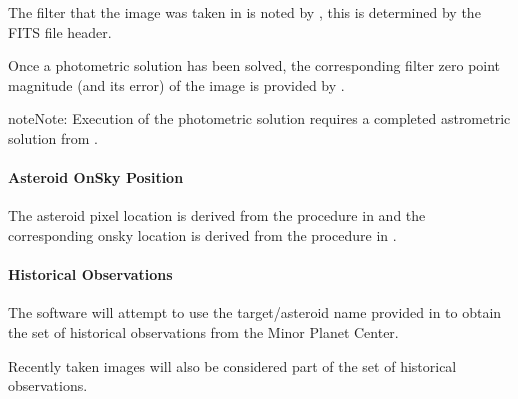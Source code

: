 \documentclass[letterpaper,11pt,english]{sphinxmanual}
\begin{document}
\sphinxAtStartPar
The filter that the image was taken in is noted by , this is
determined by the FITS file header.

\sphinxAtStartPar
Once a photometric solution has been solved, the corresponding filter zero
point magnitude (and its error) of the image is provided by
.

\begin{sphinxadmonition}{note}{Note:}
\sphinxAtStartPar
Execution of the photometric solution requires a completed astrometric
solution from
{\hyperref[\detokenize{user/manual_mode:user-manual-mode-procedure-find-asteroid-location-compute-astrometric-solution}]{}}.
\end{sphinxadmonition}


\paragraph{Asteroid On\sphinxhyphen{}Sky Position}
\label{\detokenize{user/manual_mode:asteroid-on-sky-position}}\label{\detokenize{user/manual_mode:user-manual-mode-procedure-asteroid-on-sky-position}}
\sphinxAtStartPar
The asteroid pixel location is derived from the procedure in
{\hyperref[\detokenize{user/manual_mode:user-manual-mode-procedure-find-asteroid-location-target-selector-gui}]{}}
and the corresponding on\sphinxhyphen{}sky location is derived from the procedure in
{\hyperref[\detokenize{user/manual_mode:user-manual-mode-procedure-find-asteroid-location-compute-astrometric-solution}]{}}.


\paragraph{Historical Observations}
\label{\detokenize{user/manual_mode:historical-observations}}\label{\detokenize{user/manual_mode:user-manual-mode-procedure-historical-observations}}
\sphinxAtStartPar
The software will attempt to use the target/asteroid name provided in
{\hyperref[\detokenize{user/manual_mode:user-manual-mode-procedure-specify-new-target-name}]{}}
to obtain the set of historical observations from the Minor Planet Center.

\sphinxAtStartPar
Recently taken images will also be considered part of the set of historical
observations.
\end{document}
